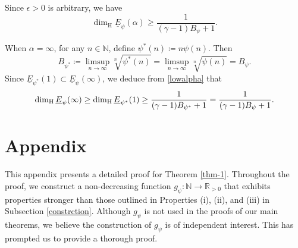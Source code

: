 \documentclass[12pt,reqno]{amsart}
\renewcommand{\=}{\coloneqq}
\theoremstyle{plain}
\begin{document}
   Since $\epsilon>0$ is arbitrary, we have
    \begin{equation*}
        \dim_{\mathrm{H}}\underline{E}_{\psi}(\alpha)
         \geq  \frac{1}{(\gamma-1)B_\psi+1}.
    \end{equation*}


When $\alpha =\infty$, for any $n \in \mathbb N$, define $\psi^*(n)\coloneqq n\psi(n)$. Then
\begin{equation*}
   B_{\psi^*}\coloneqq \limsup_{n\to \infty}\sqrt[n]{\psi^*(n)} =  \limsup_{n\to \infty}\sqrt[n]{\psi(n)} =B_\psi.
\end{equation*}
Since $\underline{E}_{\psi^*}(1) \subset \underline{E}_{\psi}(\infty)$, we deduce from \eqref{lowalpha} that
\[
\dim_{\rm H} \underline{E}_{\psi}(\infty) \geq \dim_{\rm H}\underline{E}_{\psi^*}(1) \geq \frac{1}{(\gamma-1)B_{\psi^*}+1} = \frac{1}{(\gamma-1)B_{\psi}+1}.
\]



\section{Appendix}\label{s.appendix}
This appendix presents a detailed proof for Theorem \ref{thm-1}. Throughout the proof, we construct a non-decreasing function $g_{\psi}:\mathbb{N}\to\mathbb{R}_{>0}$ that exhibits properties stronger than those outlined in Properties (i), (ii), and (iii) in Subsection \ref{constrction}. Although $g_{\psi}$ is not used in the proofs of our main theorems, we believe the construction of $g_{\psi}$ is of independent interest. This has prompted us to provide a thorough proof.
\end{document}
